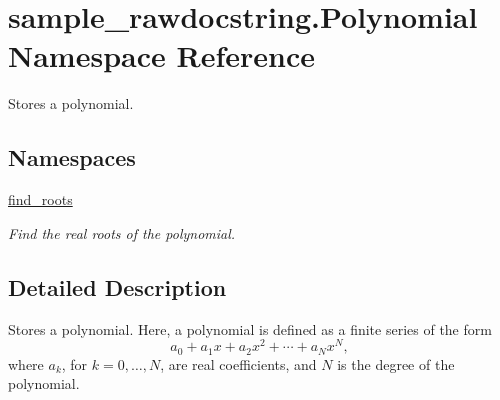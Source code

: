 \hypertarget{namespacesample__rawdocstring_1_1_polynomial}{\section{sample\-\_\-rawdocstring.\-Polynomial Namespace Reference}
\label{namespacesample__rawdocstring_1_1_polynomial}
}


Stores a polynomial.  


\subsection*{Namespaces}
\begin{DoxyCompactItemize}
\item 
\hyperlink{namespacesample__rawdocstring_1_1_polynomial_1_1find__roots}{find\-\_\-roots}
\begin{DoxyCompactList}\small\item\em Find the real roots of the polynomial. \end{DoxyCompactList}\end{DoxyCompactItemize}


\subsection{Detailed Description}
Stores a polynomial. Here, a polynomial is defined as a finite series of the form \[ a_0 + a_1 x + a_2 x^2 + \cdots + a_N x^N, \] where $ a_k $, for $k=0,\ldots,N$, are real coefficients, and $N$ is the degree of the polynomial. 